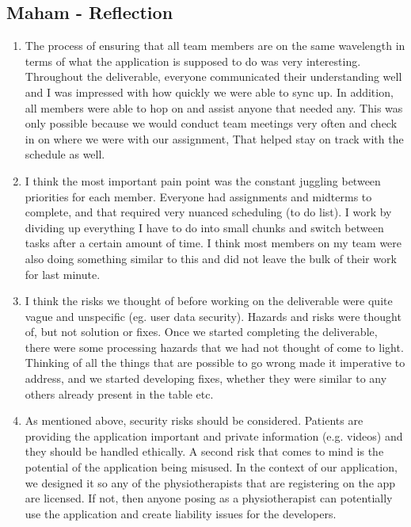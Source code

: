 \documentclass{article}
\begin{document}
\subsection*{Maham - Reflection}
\begin{enumerate}
    \item The process of ensuring that all team members are on the same wavelength in terms of what the application is supposed to do was very interesting. Throughout the deliverable, everyone communicated their understanding well and I was impressed with how quickly we were able to sync up. In addition, all members were able to hop on and assist anyone that needed any. This was only possible because we would conduct team meetings very often and check in on where we were with our assignment, That helped stay on track with the schedule as well. 
     \item I think the most important pain point was the constant juggling between priorities for each member. Everyone had assignments and midterms to complete, and that required very nuanced scheduling (to do list). I work by dividing up everything I have to do into small chunks and switch between tasks after a certain amount of time. I think most members on my team were also doing something similar to this and did not leave the bulk of their work for last minute. 
    \item I think the risks we thought of before working on the deliverable were quite vague and unspecific (eg. user data security). Hazards and risks were thought of, but not solution or fixes. Once we started completing the deliverable, there were some processing hazards that we had not thought of come to light. Thinking of all the things that are possible to go wrong made it imperative to address, and we started developing fixes, whether they were similar to any others already present in the table etc.
    \item As mentioned above, security risks should be considered. Patients are providing the application important and private information (e.g. videos) and they should be handled ethically. A second risk that comes to mind is the potential of the application being misused. In the context of our application, we designed it so any of the physiotherapists that are registering on the app are licensed. If not, then anyone posing as a physiotherapist can potentially use the application and create liability issues for the developers.
    
\end{enumerate}  
\end{document}
